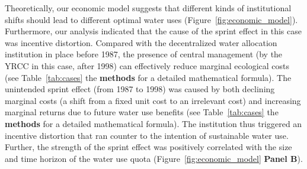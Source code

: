 Theoretically, our economic model suggests that different kinds of institutional shifts should lead to different optimal water uses (Figure~\ref{fig:economic_model}).
Furthermore, our analysis indicated that the cause of the sprint effect in this case was incentive distortion.
Compared with the decentralized water allocation institution in place before 1987, the presence of central management (by the YRCC in this case, after 1998) can effectively reduce marginal ecological costs (see Table~\ref{tab:cases} the \textbf{methods} for a detailed mathematical formula).
The unintended sprint effect (from 1987 to 1998) was caused by both declining marginal costs (a shift from a fixed unit cost to an irrelevant cost) and increasing marginal returns due to future water use benefits (see Table~\ref{tab:cases} the \textbf{methods} for a detailed mathematical formula).
The institution thus triggered an incentive distortion that ran counter to the intention of sustainable water use. Further, the strength of the sprint effect was positively correlated with the size and time horizon of the water use quota (Figure~\ref{fig:economic_model} \textbf{Panel B}).

